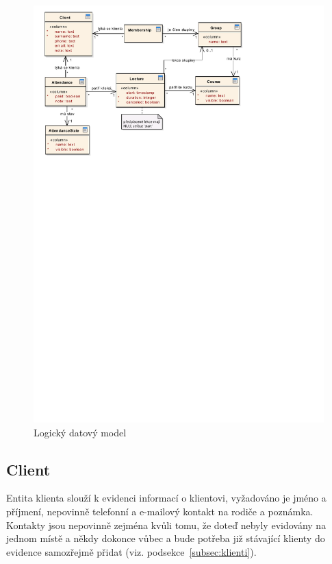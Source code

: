     \begin{figure}\centering
    	\includegraphics[width=1\textwidth]{img/db-model}
    	\caption[Logický datový model]{Logický datový model}\label{fig:db-model}
    \end{figure}
    
        \subsection{Client}
        Entita klienta slouží k evidenci informací o klientovi, vyžadováno je jméno a příjmení, nepovinně telefonní a e-mailový kontakt na rodiče a poznámka. Kontakty jsou nepovinně zejména kvůli tomu, že doteď nebyly evidovány na jednom místě a někdy dokonce vůbec a bude potřeba již stávající klienty do evidence samozřejmě přidat (viz. podsekce~\ref{subsec:klienti}).
        
